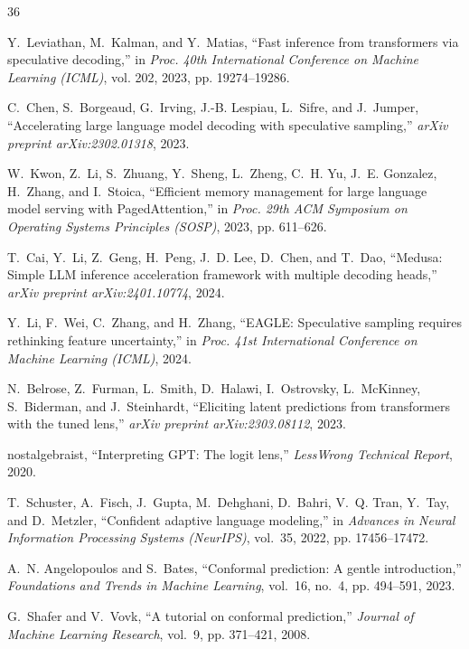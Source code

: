 \documentclass[10pt,conference]{IEEEtran}
\begin{document}
\begin{thebibliography}{36}

Y.~Leviathan, M.~Kalman, and Y.~Matias, ``Fast inference from transformers via speculative decoding,'' in \emph{Proc. 40th International Conference on Machine Learning (ICML)}, vol. 202, 2023, pp. 19274--19286.

C.~Chen, S.~Borgeaud, G.~Irving, J.-B. Lespiau, L.~Sifre, and J.~Jumper, ``Accelerating large language model decoding with speculative sampling,'' \emph{arXiv preprint arXiv:2302.01318}, 2023.

W.~Kwon, Z.~Li, S.~Zhuang, Y.~Sheng, L.~Zheng, C.~H. Yu, J.~E. Gonzalez, H.~Zhang, and I.~Stoica, ``Efficient memory management for large language model serving with {PagedAttention},'' in \emph{Proc. 29th ACM Symposium on Operating Systems Principles (SOSP)}, 2023, pp. 611--626.

T.~Cai, Y.~Li, Z.~Geng, H.~Peng, J.~D. Lee, D.~Chen, and T.~Dao, ``Medusa: Simple {LLM} inference acceleration framework with multiple decoding heads,'' \emph{arXiv preprint arXiv:2401.10774}, 2024.

Y.~Li, F.~Wei, C.~Zhang, and H.~Zhang, ``{EAGLE}: Speculative sampling requires rethinking feature uncertainty,'' in \emph{Proc. 41st International Conference on Machine Learning (ICML)}, 2024.

N.~Belrose, Z.~Furman, L.~Smith, D.~Halawi, I.~Ostrovsky, L.~McKinney, S.~Biderman, and J.~Steinhardt, ``Eliciting latent predictions from transformers with the tuned lens,'' \emph{arXiv preprint arXiv:2303.08112}, 2023.

nostalgebraist, ``Interpreting {GPT}: The logit lens,'' \emph{LessWrong Technical Report}, 2020.

T.~Schuster, A.~Fisch, J.~Gupta, M.~Dehghani, D.~Bahri, V.~Q. Tran, Y.~Tay, and D.~Metzler, ``Confident adaptive language modeling,'' in \emph{Advances in Neural Information Processing Systems (NeurIPS)}, vol.~35, 2022, pp. 17456--17472.

A.~N. Angelopoulos and S.~Bates, ``Conformal prediction: A gentle introduction,'' \emph{Foundations and Trends in Machine Learning}, vol.~16, no.~4, pp. 494--591, 2023.

G.~Shafer and V.~Vovk, ``A tutorial on conformal prediction,'' \emph{Journal of Machine Learning Research}, vol.~9, pp. 371--421, 2008.


\end{thebibliography}
\end{document}
